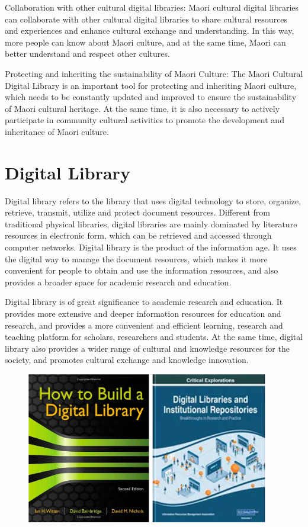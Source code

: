 Collaboration with other cultural digital libraries: Maori cultural digital libraries can collaborate with other cultural digital libraries to share cultural resources and experiences and enhance cultural exchange and understanding. In this way, more people can know about Maori culture, and at the same time, Maori can better understand and respect other cultures.

Protecting and inheriting the sustainability of Maori Culture: The Maori Cultural Digital Library is an important tool for protecting and inheriting Maori culture, which needs to be constantly updated and improved to ensure the sustainability of Maori cultural heritage. At the same time, it is also necessary to actively participate in community cultural activities to promote the development and inheritance of Maori culture.
 
\section{Digital Library}
Digital library refers to the library that uses digital technology to store, organize, retrieve, transmit, utilize and protect document resources. Different from traditional physical libraries, digital libraries are mainly dominated by literature resources in electronic form, which can be retrieved and accessed through computer networks. Digital library is the product of the information age. It uses the digital way to manage the document resources, which makes it more convenient for people to obtain and use the information resources, and also provides a broader space for academic research and education.

Digital library is of great significance to academic research and education. It provides more extensive and deeper information resources for education and research, and provides a more convenient and efficient learning, research and teaching platform for scholars, researchers and students. At the same time, digital library also provides a wider range of cultural and knowledge resources for the society, and promotes cultural exchange and knowledge innovation.

\begin{figure}[htbp]
  \centerline{\includegraphics[width=300pt]{images/M1-2-2.png}}
\end{figure}

